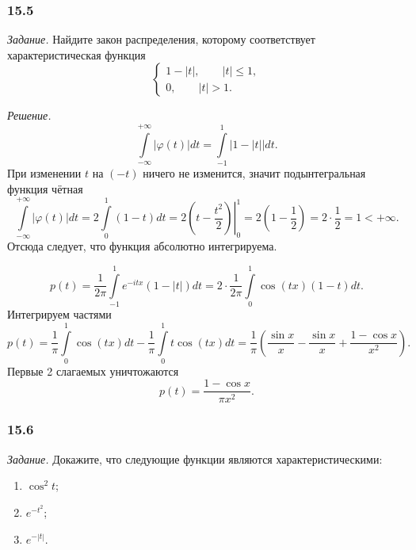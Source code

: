\subsubsection*{15.5}

\textit{Задание.} Найдите закон распределения, которому соответствует характеристическая функция
$$ \begin{cases}
1 - \left| t \right|, \qquad \left| t \right| \leq 1, \\
0, \qquad \left| t \right| > 1.
\end{cases}$$

\textit{Решение.}
$$ \int \limits_{- \infty }^{+ \infty } \left| \varphi \left( t \right) \right| dt =
\int \limits_{- 1}^1 \left| 1 - \left| t \right| \right| dt.$$
При изменении $t$ на $ \left( - t \right) $ ничего не изменится, значит подынтегральная функция чётная
$$ \int \limits_{- \infty }^{+ \infty } \left| \varphi \left( t \right) \right| dt =
2 \int \limits_0^1 \left( 1 - t \right) dt =
2 \left. \left( t - \frac{t^2}{2} \right) \right|_0^1 =
2 \left( 1 - \frac{1}{2} \right) =
2 \cdot \frac{1}{2} =
1 < + \infty.$$
Отсюда следует, что функция абсолютно интегрируема.

$$p \left( t \right) =
\frac{1}{2 \pi } \int \limits_{-1}^1 e^{- itx} \left( 1 - \left| t \right| \right) dt =
2 \cdot \frac{1}{2 \pi } \int \limits_0^1 \cos \left( tx \right) \left( 1 - t \right) dt.$$
Интегрируем частями
$$p \left( t \right) =
\frac{1}{ \pi } \int \limits_0^1 \cos \left( tx \right) dt - \frac{1}{ \pi } \int \limits_0^1 t \cos \left( tx \right) dt =
\frac{1}{ \pi } \left( \frac{ \sin x}{x} - \frac{ \sin x}{x} + \frac{1 - \cos x}{x^2} \right).$$
Первые 2 слагаемых уничтожаются
$$p \left( t \right) =
\frac{1 - \cos x}{ \pi x^2}.$$

\subsubsection*{15.6}

\textit{Задание.} Докажите, что следующие функции являются характеристическими:
\begin{enumerate}[label=\alph*)]
\item $ \cos^2 t$;
\item $e^{- t^2}$;
\item $e^{- \left| t \right| }$.
\end{enumerate}

